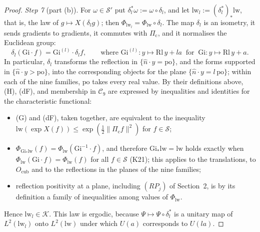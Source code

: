 \documentclass[11pt,letterpaper,reqno]{amsart}
\theoremstyle{definition}
\begin{document}
\begin{proof}
\emph{Step 7} (part (b)).
For $\omega\in\mathcal S'$ put $\delta_l^*\omega:=\omega\circ\delta_l$, and let $\mathrm{lw}_l:=(\delta_l^*)_*\mathrm{lw}$, that is, the law of $g\mapsto X(\delta_lg)$; then $\Phi_{\mathrm{lw}_l}=\Phi_{\mathrm{lw}}\circ\delta_l$.
The map $\delta_l$ is an isometry, it sends gradients to gradients, it commutes with $\Pi_{\mathrm c}$, and it normalises the Euclidean group:
\begin{equation*}
\delta_l(\mathrm{Gi}\cdot f)=\mathrm{Gi}^{(l)}\cdot\delta_lf,\qquad\text{where }\mathrm{Gi}^{(l)}\colon y\mapsto\mathrm{Rl}\,y+la\ \text{ for }\ \mathrm{Gi}\colon y\mapsto\mathrm{Rl}\,y+a.
\end{equation*}
In particular, $\delta_l$ transforms the reflection in $\{\hat n\cdot y=\mathrm{po}\}$, and the forms supported in $\{\hat n\cdot y>\mathrm{po}\}$, into the corresponding objects for the plane $\{\hat n\cdot y=l\,\mathrm{po}\}$; within each of the nine families, $\mathrm{po}$ takes every real value.
By their definitions above, (H), (dF), and membership in $\mathcal C_9$ are expressed by inequalities and identities for the characteristic functional:
\begin{itemize}
\item[(i)] (G) and (dF), taken together, are equivalent to the inequality $\mathrm{lw}(\exp X(f))\le\exp(\frac12\|\Pi_{\mathrm c}f\|^2)$ for $f\in\mathcal S$;
\item[(ii)] $\Phi_{\mathrm{Gi}_*\mathrm{lw}}(f)=\allowbreak \Phi_{\mathrm{lw}}(\mathrm{Gi}^{-1}\cdot f)$, and therefore $\mathrm{Gi}_*\mathrm{lw}=\mathrm{lw}$ holds exactly when $\Phi_{\mathrm{lw}}(\mathrm{Gi}\cdot f)=\Phi_{\mathrm{lw}}(f)$ for all $f\in\mathcal S$ (K21); this applies to the translations, to $O_{\mathrm{cub}}$ and to the reflections in the planes of the nine families;
\item[(iii)] reflection positivity at a plane, including $(RP_j)$ of Section~2, is by its definition a family of inequalities among values of $\Phi_{\mathrm{lw}}$.
\end{itemize}
Hence $\mathrm{lw}_l\in\mathcal K$.
This law is ergodic, because $\Psi\mapsto\Psi\circ\delta_l^*$ is a unitary map of $L^2(\mathrm{lw}_l)$ onto $L^2(\mathrm{lw})$ under which $U(a)$ corresponds to $U(la)$.


\end{proof}
\end{document}
